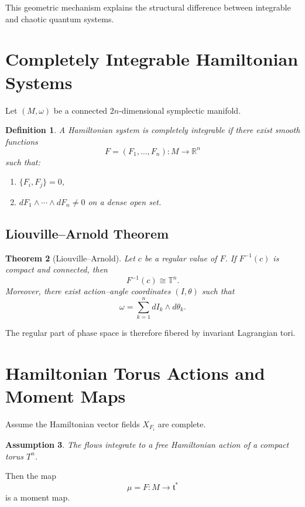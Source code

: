 \documentclass[11pt]{article}
\newtheorem{theorem}{Theorem}[section]
\newtheorem{definition}[theorem]{Definition}
\newtheorem{assumption}[theorem]{Assumption}
\begin{document}
This geometric mechanism explains the structural difference between integrable and chaotic quantum systems.

\section{Completely Integrable Hamiltonian Systems}

Let $(M,\omega)$ be a connected $2n$-dimensional symplectic manifold.

\begin{definition}
A Hamiltonian system is completely integrable if there exist smooth functions
\[
F = (F_1,\dots,F_n): M \to \mathbb{R}^n
\]
such that:
\begin{enumerate}[label=(\roman*)]
\item $\{F_i,F_j\}=0$,
\item $dF_1 \wedge \cdots \wedge dF_n \neq 0$ on a dense open set.
\end{enumerate}
\end{definition}

\subsection{Liouville--Arnold Theorem}

\begin{theorem}[Liouville--Arnold]
Let $c$ be a regular value of $F$. 
If $F^{-1}(c)$ is compact and connected, then
\[
F^{-1}(c) \cong \mathbb{T}^n.
\]
Moreover, there exist action--angle coordinates $(I,\theta)$ such that
\[
\omega = \sum_{k=1}^n dI_k \wedge d\theta_k.
\]
\end{theorem}

The regular part of phase space is therefore fibered by invariant Lagrangian tori.

\section{Hamiltonian Torus Actions and Moment Maps}

Assume the Hamiltonian vector fields $X_{F_i}$ are complete.

\begin{assumption}
The flows integrate to a free Hamiltonian action of a compact torus $T^n$.
\end{assumption}

Then the map
\[
\mu = F : M \to \mathfrak{t}^*
\]
is a moment map.
\end{document}
